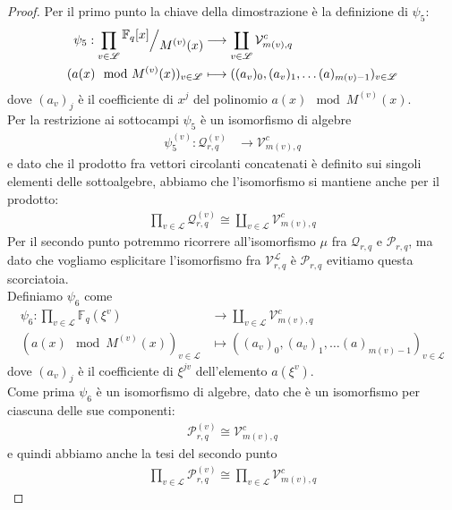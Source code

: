\begin{proof}
   Per il primo punto la chiave della dimostrazione è la definizione di $\psi_{5}$:
   \begin{align*}
  \psi_{5} :  \prod_{v\in \mathscr{L}} \quotient{\mathbb{F}_{q} \lbrack x \rbrack  }{M^{(v)}(x)}    
      & \longrightarrow  
      \coprod_{v\in \mathscr{L} } \mathcal{V}_{m(v), q}^{c}   \\
      ( a(x) \mod{M^{(v)}(x)} )_{v \in \mathscr{L}} 
      &\longmapsto  
      ( (a_v )_0, (a_v)_1, \dots (a)_{m(v)-1})_{v \in \mathscr{L}} 
  \end{align*}
  dove $(a_v)_{j}$ è il coefficiente di $x^j$ del polinomio $a(x) \mod{M^{(v)}(x)}$.\\
  Per la restrizione ai sottocampi $\psi_{5}$ è un isomorfismo di algebre
  \begin{align*}
  \psi_{5}^{(v)} :  \mathcal{Q}_{r,q}^{(v)}    
      & \longrightarrow  
     \mathcal{V}_{m(v), q}^{c}   
  \end{align*}
  e dato che il prodotto fra vettori circolanti concatenati è definito sui singoli elementi delle sottoalgebre, abbiamo che l'isomorfismo si mantiene anche per il prodotto:
  \begin{align*}
     \prod_{v \in \mathscr{L} } \mathcal{Q}_{r,q}^{(v)} 
     \cong  
     \coprod_{v \in \mathscr{L} } \mathcal{V}_{m(v),q}^{c}
  \end{align*}  
  Per il secondo punto potremmo ricorrere all'isomorfismo $\mu$ fra $\mathcal{Q}_{r,q}$ e $\mathcal{P}_{r,q}$, ma dato che vogliamo esplicitare l'isomorfismo fra $\mathcal{V}_{r,q}^{\mathscr{L}}$ è $\mathcal{P}_{r,q}$ evitiamo questa scorciatoia.\\
  Definiamo $\psi_{6}$ come
   \begin{align*}
  \psi_{6} :  \prod_{v\in \mathscr{L}} \mathbb{F}_{q} (\xi^{v})  
      & \longrightarrow  
      \coprod_{v\in \mathscr{L} } \mathcal{V}_{m(v), q}^{c}   \\
      ( a(x) \mod{M^{(v)}(x)} )_{v \in \mathscr{L}} 
      &\longmapsto  
      ( (a_v )_0, (a_v)_1, \dots (a)_{m(v)-1})_{v \in \mathscr{L}} 
  \end{align*}
  dove $(a_v)_{j}$ è il coefficiente di $\xi^{jv}$ dell'elemento $a(\xi^{v})$.\\  
  Come prima $\psi_{6}$ è un isomorfismo di algebre, dato che è un isomorfismo per ciascuna delle sue componenti:
  \begin{align*}
     \mathcal{P}_{r,q}^{(v)} \cong \mathcal{V}_{m(v),q}^{c}
  \end{align*}
  e quindi abbiamo anche la tesi del secondo punto
  \begin{align*}
     \prod_{v \in \mathscr{L} } \mathcal{P}_{r,q}^{(v)} 
     \cong  
     \prod_{v \in \mathscr{L} } \mathcal{V}_{m(v),q}^{c}
  \end{align*}
\end{proof}
